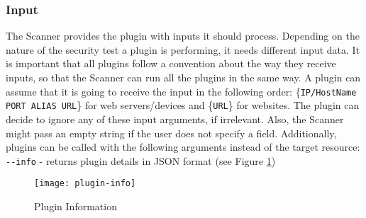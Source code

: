 \subsubsection{Input}
The Scanner provides the plugin with inputs it should process. Depending on the nature of the security test a plugin is performing, it needs different input data. It is important that all plugins follow a convention about the way they receive inputs, so that the Scanner can run all the plugins in the same way. A plugin can assume that it is going to receive the input in the following order: \{\texttt{IP/HostName PORT ALIAS URL}\} for web servers/devices and \{\texttt{URL}\} for websites. The plugin can decide to ignore any of these input arguments, if irrelevant. Also, the Scanner might pass an empty string if the user does not specify a field.
Additionally, plugins can be called with the following arguments instead of the target resource:
\texttt{-{}-info} - returns plugin details in JSON format (see Figure \ref{figure:plugin-info})  
\begin{figure}[h!]

  \centering
    \texttt{[image: plugin-info]}
  \caption{Plugin Information}
\label{figure:plugin-info}
  
\end{figure}
